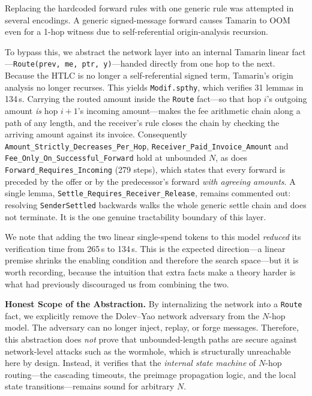 \documentclass[sigconf,review]{acmart}
\theoremstyle{acmdefinition}
\begin{document}
Replacing the hardcoded forward rules with one generic rule was attempted in several encodings. A generic signed-message forward causes Tamarin to OOM even for a 1-hop witness due to self-referential origin-analysis recursion.

To bypass this, we abstract the network layer into an internal Tamarin linear fact---\texttt{Route(prev, me, ptr, y)}---handed directly from one hop to the next. Because the HTLC is no longer a self-referential signed term, Tamarin's origin analysis no longer recurses. This yields \texttt{Modif.spthy}, which verifies 31 lemmas in 134\,s. Carrying the routed amount inside the \texttt{Route} fact---so that hop $i$'s outgoing amount \emph{is} hop $i{+}1$'s incoming amount---makes the fee arithmetic chain along a path of any length, and the receiver's rule closes the chain by checking the arriving amount against its invoice. Consequently \texttt{Amount\_Strictly\_Decreases\_Per\_Hop}, \texttt{Receiver\_Paid\_Invoice\_Amount} and \texttt{Fee\_Only\_On\_Successful\_Forward} hold at unbounded $N$, as does \texttt{Forward\_Requires\_Incoming} (279 steps), which states that every forward is preceded by the offer or by the predecessor's forward \emph{with agreeing amounts}. A single lemma, \texttt{Settle\_Requires\_Receiver\_Release}, remains commented out: resolving \texttt{SenderSettled} backwards walks the whole generic settle chain and does not terminate. It is the one genuine tractability boundary of this layer.

We note that adding the two linear single-spend tokens to this model \emph{reduced} its verification time from 265\,s to 134\,s. This is the expected direction---a linear premise shrinks the enabling condition and therefore the search space---but it is worth recording, because the intuition that extra facts make a theory harder is what had previously discouraged us from combining the two.

\textbf{Honest Scope of the Abstraction.} By internalizing the network into a \texttt{Route} fact, we explicitly remove the Dolev--Yao network adversary from the $N$-hop model. The adversary can no longer inject, replay, or forge messages. Therefore, this abstraction does \emph{not} prove that unbounded-length paths are secure against network-level attacks such as the wormhole, which is structurally unreachable here by design. Instead, it verifies that the \emph{internal state machine} of $N$-hop routing---the cascading timeouts, the preimage propagation logic, and the local state transitions---remains sound for arbitrary $N$.
\end{document}
